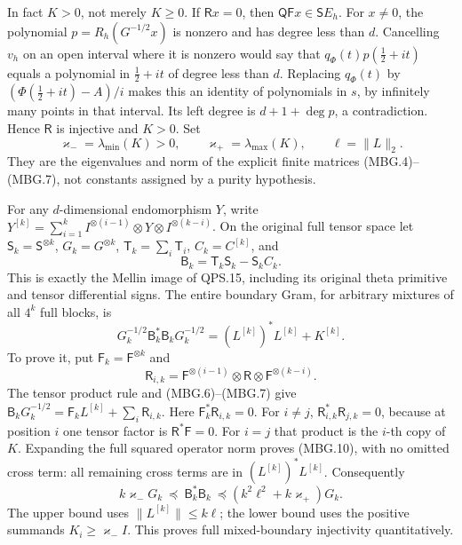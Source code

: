 In fact \(K>0\), not merely \(K\ge0\). If \(\mathsf R x=0\), then
\(\mathsf Q\mathsf F x\in\mathsf S E_h\). For \(x\ne0\), the
polynomial \(p=R_h(G^{-1/2}x)\) is nonzero and has degree less than
\(d\). Cancelling \(v_h\) on an open interval where it is nonzero
would say that \(q_\Phi(t)p(\tfrac12+it)\) equals a polynomial in
\(\tfrac12+it\) of degree less than \(d\). Replacing \(q_\Phi(t)\)
by \((\Phi(\tfrac12+it)-A)/i\) makes this an identity of polynomials
in \(s\), by infinitely many points in that interval. Its left
degree is \(d+1+\deg p\), a contradiction. Hence \(\mathsf R\) is
injective and \(K>0\). Set
\[
 \varkappa_-=\lambda_{\min}(K)>0,\qquad
 \varkappa_+=\lambda_{\max}(K),\qquad \ell=\|L\|_2 .
 \tag{MBG.8}\label{GraphV2:eq:mbg-finite-constants}
\]
They are the eigenvalues and norm of the explicit finite matrices
(MBG.4)--(MBG.7), not constants assigned by a purity hypothesis.

For any \(d\)-dimensional endomorphism \(Y\), write
\(Y^{[k]}=\sum_{i=1}^k I^{\otimes(i-1)}\otimes Y\otimes
I^{\otimes(k-i)}\). On the original full tensor space let
\(\mathsf S_k=\mathsf S^{\otimes k}\), \(G_k=G^{\otimes k}\),
\(\mathsf T_k=\sum_i\mathsf T_i\), \(C_k=C^{[k]}\), and
\[
 \mathsf B_k=\mathsf T_k\mathsf S_k-\mathsf S_k C_k .
 \tag{MBG.9}\label{GraphV2:eq:mbg-boundary}
\]
This is exactly the Mellin image of QPS.15, including its original
theta primitive and tensor differential signs. The entire boundary
Gram, for arbitrary mixtures of all \(4^k\) full blocks, is
\[
 \boxed{\quad
 G_k^{-1/2}\mathsf B_k^*\mathsf B_kG_k^{-1/2}
       =(L^{[k]})^*L^{[k]}+K^{[k]} .\quad}
 \tag{MBG.10}\label{GraphV2:eq:mbg-total-gram}
\]
To prove it, put \(\mathsf F_k=\mathsf F^{\otimes k}\) and
\[
 \mathsf R_{i,k}
   =\mathsf F^{\otimes(i-1)}\otimes\mathsf R
                                  \otimes\mathsf F^{\otimes(k-i)}.
\]
The tensor product rule and (MBG.6)--(MBG.7) give
\(\mathsf B_kG_k^{-1/2}
=\mathsf F_kL^{[k]}+\sum_i\mathsf R_{i,k}\).
Here \(\mathsf F_k^*\mathsf R_{i,k}=0\). For \(i\ne j\),
\(\mathsf R_{i,k}^*\mathsf R_{j,k}=0\), because at position \(i\)
one tensor factor is \(\mathsf R^*\mathsf F=0\). For \(i=j\) that
product is the \(i\)-th copy of \(K\). Expanding the full squared
operator norm proves (MBG.10), with no omitted cross term:
all remaining cross terms are in \((L^{[k]})^*L^{[k]}\).
Consequently
\[
 k\varkappa_-G_k\ \preceq\ \mathsf B_k^*\mathsf B_k\
 \preceq (k^2\ell^2+k\varkappa_+)G_k .
 \tag{MBG.11}\label{GraphV2:eq:mbg-boundary-bounds}
\]
The upper bound uses \(\|L^{[k]}\|\le k\ell\); the lower bound uses
the positive summands \(K_i\ge\varkappa_-I\).
This proves full mixed-boundary injectivity quantitatively.

